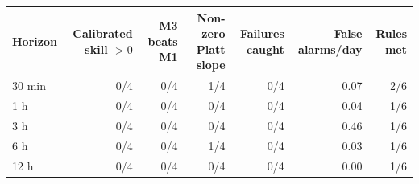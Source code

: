 \begin{tabular}{lrrrrrr}\toprule Horizon & Calibrated skill $>0$ & M3 beats M1 & Non-zero Platt slope & Failures caught & False alarms/day & Rules met\\\midrule
30 min & 0/4 & 0/4 & 1/4 & 0/4 & 0.07 & 2/6\\
1 h & 0/4 & 0/4 & 0/4 & 0/4 & 0.04 & 1/6\\
3 h & 0/4 & 0/4 & 0/4 & 0/4 & 0.46 & 1/6\\
6 h & 0/4 & 0/4 & 1/4 & 0/4 & 0.03 & 1/6\\
12 h & 0/4 & 0/4 & 0/4 & 0/4 & 0.00 & 1/6\\
\bottomrule\end{tabular}

